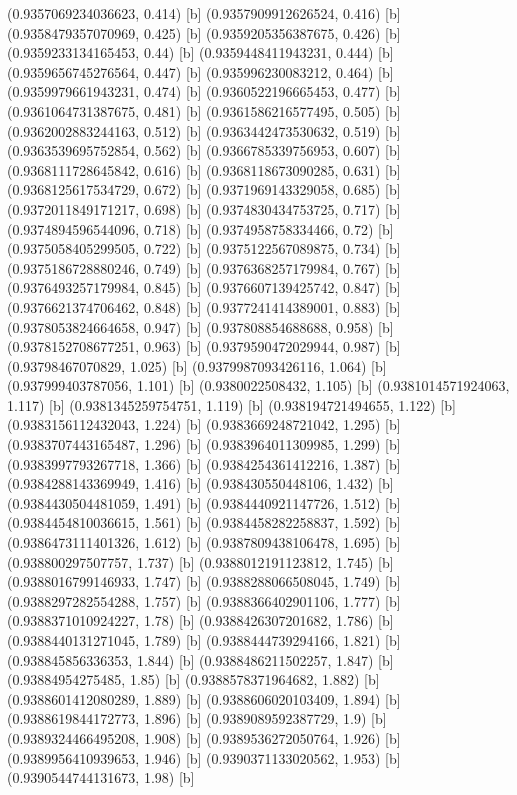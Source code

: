 {{{(0.9357069234036623, 0.414) [b] 
(0.9357909912626524, 0.416) [b] 
(0.9358479357070969, 0.425) [b] 
(0.9359205356387675, 0.426) [b] 
(0.9359233134165453, 0.44) [b] 
(0.9359448411943231, 0.444) [b] 
(0.9359656745276564, 0.447) [b] 
(0.935996230083212, 0.464) [b] 
(0.9359979661943231, 0.474) [b] 
(0.9360522196665453, 0.477) [b] 
(0.9361064731387675, 0.481) [b] 
(0.9361586216577495, 0.505) [b] 
(0.9362002883244163, 0.512) [b] 
(0.9363442473530632, 0.519) [b] 
(0.9363539695752854, 0.562) [b] 
(0.9366785339756953, 0.607) [b] 
(0.9368111728645842, 0.616) [b] 
(0.9368118673090285, 0.631) [b] 
(0.9368125617534729, 0.672) [b] 
(0.9371969143329058, 0.685) [b] 
(0.9372011849171217, 0.698) [b] 
(0.9374830434753725, 0.717) [b] 
(0.9374894596544096, 0.718) [b] 
(0.9374958758334466, 0.72) [b] 
(0.9375058405299505, 0.722) [b] 
(0.9375122567089875, 0.734) [b] 
(0.9375186728880246, 0.749) [b] 
(0.9376368257179984, 0.767) [b] 
(0.9376493257179984, 0.845) [b] 
(0.9376607139425742, 0.847) [b] 
(0.9376621374706462, 0.848) [b] 
(0.9377241414389001, 0.883) [b] 
(0.9378053824664658, 0.947) [b] 
(0.937808854688688, 0.958) [b] 
(0.9378152708677251, 0.963) [b] 
(0.9379590472029944, 0.987) [b] 
(0.93798467070829, 1.025) [b] 
(0.9379987093426116, 1.064) [b] 
(0.937999403787056, 1.101) [b] 
(0.9380022508432, 1.105) [b] 
(0.9381014571924063, 1.117) [b] 
(0.9381345259754751, 1.119) [b] 
(0.938194721494655, 1.122) [b] 
(0.9383156112432043, 1.224) [b] 
(0.9383669248721042, 1.295) [b] 
(0.9383707443165487, 1.296) [b] 
(0.9383964011309985, 1.299) [b] 
(0.9383997793267718, 1.366) [b] 
(0.9384254361412216, 1.387) [b] 
(0.9384288143369949, 1.416) [b] 
(0.938430550448106, 1.432) [b] 
(0.9384430504481059, 1.491) [b] 
(0.9384440921147726, 1.512) [b] 
(0.9384454810036615, 1.561) [b] 
(0.9384458282258837, 1.592) [b] 
(0.9386473111401326, 1.612) [b] 
(0.9387809438106478, 1.695) [b] 
(0.938800297507757, 1.737) [b] 
(0.9388012191123812, 1.745) [b] 
(0.9388016799146933, 1.747) [b] 
(0.9388288066508045, 1.749) [b] 
(0.9388297282554288, 1.757) [b] 
(0.9388366402901106, 1.777) [b] 
(0.9388371010924227, 1.78) [b] 
(0.9388426307201682, 1.786) [b] 
(0.9388440131271045, 1.789) [b] 
(0.9388444739294166, 1.821) [b] 
(0.938845856336353, 1.844) [b] 
(0.9388486211502257, 1.847) [b] 
(0.93884954275485, 1.85) [b] 
(0.9388578371964682, 1.882) [b] 
(0.9388601412080289, 1.889) [b] 
(0.9388606020103409, 1.894) [b] 
(0.9388619844172773, 1.896) [b] 
(0.9389089592387729, 1.9) [b] 
(0.9389324466495208, 1.908) [b] 
(0.9389536272050764, 1.926) [b] 
(0.9389956410939653, 1.946) [b] 
(0.9390371133020562, 1.953) [b] 
(0.9390544744131673, 1.98) [b] 
}}}
